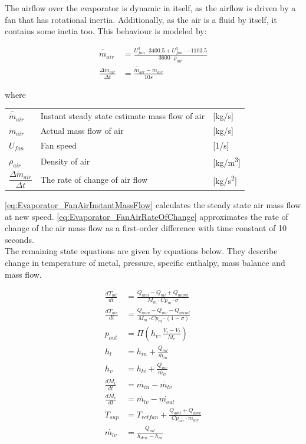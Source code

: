 The airflow over the evaporator is dynamic in itself, as the airflow is driven by a fan that has rotational inertia. Additionally, as the air is a fluid by itself, it contains some inetia too. This behaviour is modeled by:

\begin{align}
	\bar{\dot{m}}_{air} & = \frac{U_{fan}^2 \cdot 3400.5 + U_{fan}^3 \cdot -1103.5} {3600 \cdot \rho_{air}} \label{eq:Evaporator_FanAirInstantMassFlow}\\ 
	\frac{\Delta \dot{m}_{air}}{\Delta t} & = \frac{\bar{\dot{m}}_{air}  - \dot{m}_{air}} {10s} \label{eq:Evaporator_FanAirRateOfChange}
\end{align} 

where

\begin{center}
	\begin{tabular}{l p{8cm} l}
		$\bar{\dot{m}}_{air}$						& Instant steady state estimate mass flow of air  		& [\si{kg}/\si{s}] \\		
		$\dot{m}_{air}$								& Actual mass flow of air								& [\si{kg}/\si{s}] \\		
		$U_{fan}$									& Fan speed 											& [1/\si{s}] \\		
		$\rho_{air}$								& Density of air										& [\si{kg}/\si{m^3}] \\[0.2cm]		
		$\dfrac{\Delta \dot{m}_{air}}{\Delta t} $ 	& The rate of change of	air flow 						& [\si{kg}/\si{s^2}]
	\end{tabular}
\end{center}

\cref{eq:Evaporator_FanAirInstantMassFlow} calculates the steady state air mass flow at new speed. \cref{eq:Evaporator_FanAirRateOfChange} approximates the rate of change of the air mass flow as a first-order difference with time constant of 10 seconds. \\

The remaining state equations are given by equations below. They describe change in temperature of metal, pressure, specific enthalpy, mass balance and mass flow.

\begin{align}
	\frac{dT_{ml}}{dt} & = \frac{Q_{aml}-Q_{ml} + Q_{mvml}}{M_m \cdot Cp_m \cdot \sigma} \\
	\frac{dT_{mv}}{dt} & = \frac{Q_{amv} - Q_{mv} - Q_{mvml}}{M_m \cdot Cp_m \cdot (1- \sigma)} \\
	p_{out} & = \Pi \left( h_v, \frac{V_i-V_l}{M_v} \right)\\
	h_l & = h_{in} + \frac{Q_{ml}}{\dot{m_{in}}}\\
	h_v & = h_{lv} + \frac{Q_{mv}}{\dot{m_{lv}}}\\
	\frac{dM_l}{dt} & = \dot{m_{in}} - \dot{m_{lv}}\\
	\frac{dM_v}{dt} & = \dot{m_{lv}} - \dot{m_{out}}\\
	T_{sup} & = T_{retfan} +  \frac{Q_{aml} + Q_{amv}}{Cp_{air} \cdot \dot{m_{air}}} \\
	\dot{m_{lv}} & = \frac{Q_{ml}}{h_{dew} - h_{in}}
\end{align}


